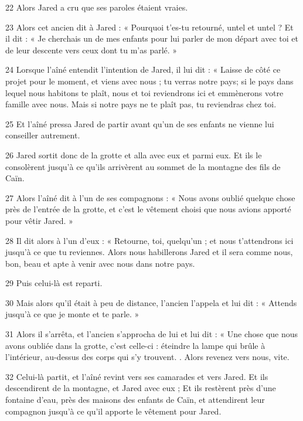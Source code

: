 \par 22 Alors Jared a cru que ses paroles étaient vraies.

\par 23 Alors cet ancien dit à Jared : « Pourquoi t'es-tu retourné, untel et untel ? Et il dit : « Je cherchais un de mes enfants pour lui parler de mon départ avec toi et de leur descente vers ceux dont tu m'as parlé. »

\par 24 Lorsque l'aîné entendit l'intention de Jared, il lui dit : « Laisse de côté ce projet pour le moment, et viens avec nous ; tu verras notre pays; si le pays dans lequel nous habitons te plaît, nous et toi reviendrons ici et emmènerons votre famille avec nous. Mais si notre pays ne te plaît pas, tu reviendras chez toi.

\par 25 Et l'aîné pressa Jared de partir avant qu'un de ses enfants ne vienne lui conseiller autrement.

\par 26 Jared sortit donc de la grotte et alla avec eux et parmi eux. Et ils le consolèrent jusqu'à ce qu'ils arrivèrent au sommet de la montagne des fils de Caïn.

\par 27 Alors l'aîné dit à l'un de ses compagnons : « Nous avons oublié quelque chose près de l'entrée de la grotte, et c'est le vêtement choisi que nous avions apporté pour vêtir Jared. »

\par 28 Il dit alors à l'un d'eux : « Retourne, toi, quelqu'un ; et nous t'attendrons ici jusqu'à ce que tu reviennes. Alors nous habillerons Jared et il sera comme nous, bon, beau et apte à venir avec nous dans notre pays.

\par 29 Puis celui-là est reparti.

\par 30 Mais alors qu'il était à peu de distance, l'ancien l'appela et lui dit : « Attends jusqu'à ce que je monte et te parle. »

\par 31 Alors il s'arrêta, et l'ancien s'approcha de lui et lui dit : « Une chose que nous avons oubliée dans la grotte, c'est celle-ci : éteindre la lampe qui brûle à l'intérieur, au-dessus des corps qui s'y trouvent. . Alors revenez vers nous, vite.

\par 32 Celui-là partit, et l'aîné revint vers ses camarades et vers Jared. Et ils descendirent de la montagne, et Jared avec eux ; Et ils restèrent près d'une fontaine d'eau, près des maisons des enfants de Caïn, et attendirent leur compagnon jusqu'à ce qu'il apporte le vêtement pour Jared.


